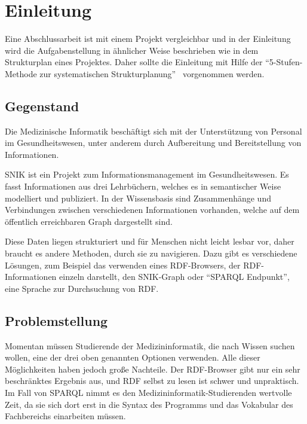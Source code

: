 \chapter{Einleitung}\label{ch:introduction}
Eine Abschlussarbeit ist mit einem Projekt vergleichbar und in der Einleitung wird die Aufgabenstellung in ähnlicher Weise beschrieben wie in dem Strukturplan eines Projektes.
Daher sollte die Einleitung mit Hilfe der \enquote{5-Stufen-Methode zur systematischen Strukturplanung}~\citep{ob}\footnotemark{} vorgenommen werden.

\section{Gegenstand}

Die Medizinische Informatik beschäftigt sich mit der Unterstützung von Personal im Gesundheitswesen, unter anderem durch Aufbereitung und Bereitstellung von Informationen.

SNIK ist ein Projekt zum Informationsmanagement im Gesundheitswesen.
Es fasst Informationen aus drei Lehrbüchern, welches es in semantischer Weise modelliert und publiziert.
In der Wissensbasis sind Zusammenhänge und Verbindungen zwischen verschiedenen Informationen vorhanden, welche auf dem öffentlich erreichbaren Graph dargestellt sind.

Diese Daten liegen strukturiert und für Menschen nicht leicht lesbar vor, daher braucht es andere Methoden, durch sie zu navigieren.
Dazu gibt es verschiedene Lösungen, zum Beispiel das verwenden eines RDF-Browsers, der RDF-Informationen einzeln darstellt, den SNIK-Graph oder \enquote{SPARQL Endpunkt}, eine Sprache zur Durchsuchung von RDF.

\section{Problemstellung}

Momentan müssen Studierende der Medizininformatik, die nach Wissen suchen wollen, eine der drei oben genannten Optionen verwenden.
Alle dieser Möglichkeiten haben jedoch große Nachteile. Der RDF-Browser gibt nur ein sehr beschränktes Ergebnis aus, und RDF selbst zu lesen ist schwer und unpraktisch.
Im Fall von SPARQL nimmt es den Medizininformatik-Studierenden wertvolle Zeit, da sie sich dort erst in die Syntax des Programms und das Vokabular des Fachbereichs einarbeiten müssen.

